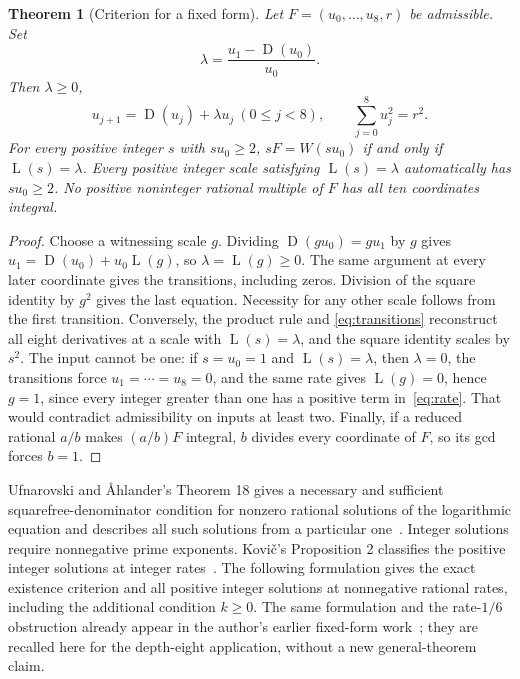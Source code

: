 \documentclass[11pt]{article}
\newcommand{\D}{\operatorname{D}}
\newcommand{\Lrate}{\operatorname{L}}
\newtheorem{theorem}{Theorem}[section]
\theoremstyle{definition}
\theoremstyle{remark}
\begin{document}
\begin{theorem}[Criterion for a fixed form]\label{thm:criterion}
Let $F=(u_0,\ldots,u_8,r)$ be admissible. Set
\begin{equation}\label{eq:lambda}
 \lambda=\frac{u_1-\D(u_0)}{u_0}.
\end{equation}
Then $\lambda\ge0$,
\begin{equation}\label{eq:transitions}
 u_{j+1}=\D(u_j)+\lambda u_j\ (0\le j<8),
 \qquad \sum_{j=0}^8u_j^2=r^2.
\end{equation}
For every positive integer $s$ with $su_0\ge2$,
$sF=W(su_0)$ if and only if $\Lrate(s)=\lambda$.
Every positive integer scale satisfying $\Lrate(s)=\lambda$
automatically has $su_0\ge2$. No positive noninteger rational multiple of $F$
has all ten coordinates integral.
\end{theorem}
\begin{proof}
Choose a witnessing scale $g$. Dividing
$\D(gu_0)=gu_1$ by $g$ gives
$u_1=\D(u_0)+u_0\Lrate(g)$, so $\lambda=\Lrate(g)\ge0$.
The same argument at every later coordinate gives the transitions,
including zeros. Division of the square identity by $g^2$ gives the
last equation. Necessity for any other scale follows from the first
transition. Conversely, the product rule and
\eqref{eq:transitions} reconstruct all eight derivatives at a scale
with $\Lrate(s)=\lambda$, and the square identity scales by $s^2$.
The input cannot be one: if $s=u_0=1$ and $\Lrate(s)=\lambda$, then
$\lambda=0$, the transitions force $u_1=\cdots=u_8=0$, and the
same rate gives $\Lrate(g)=0$, hence $g=1$, since
every integer greater than one has a positive term in~\eqref{eq:rate}.
That would contradict admissibility on inputs at least two.
Finally, if a reduced rational $a/b$ makes $(a/b)F$ integral, $b$
divides every coordinate of $F$, so its gcd forces $b=1$.
\end{proof}

Ufnarovski and \AA hlander's Theorem 18 gives a necessary and
sufficient squarefree-denominator condition for nonzero rational
solutions of the logarithmic equation and describes all such solutions
from a particular one~\cite[Section 8]{ufnarovski}. Integer solutions
require nonnegative prime exponents. Kovi\v{c}'s Proposition 2
classifies the positive integer solutions at integer rates~\cite{kovic}.
The following formulation gives the exact existence criterion and all
positive integer solutions at nonnegative rational rates, including
the additional condition $k\ge0$. The same formulation and the
rate-$1/6$ obstruction already appear in the author's earlier
fixed-form work~\cite[Section 3]{corti5}; they are recalled here for
the depth-eight application, without a new general-theorem claim.
\end{document}
